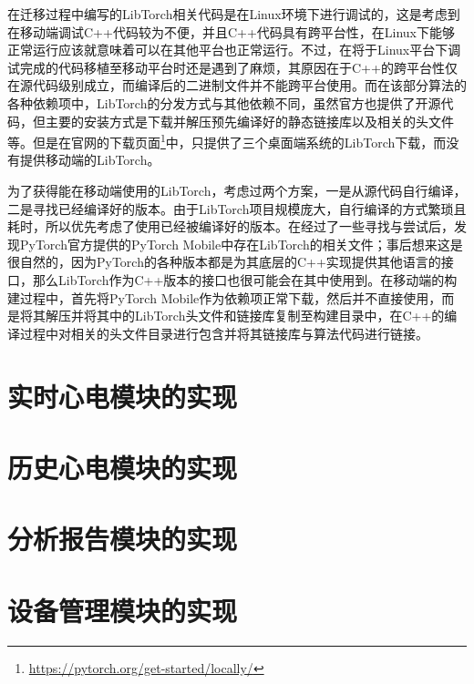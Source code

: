在迁移过程中编写的LibTorch相关代码是在Linux环境下进行调试的，这是考虑到在移动端调试C++代码较为不便，并且C++代码具有跨平台性，在Linux下能够正常运行应该就意味着可以在其他平台也正常运行。不过，在将于Linux平台下调试完成的代码移植至移动平台时还是遇到了麻烦，其原因在于C++的跨平台性仅在源代码级别成立，而编译后的二进制文件并不能跨平台使用。而在该部分算法的各种依赖项中，LibTorch的分发方式与其他依赖不同，虽然官方也提供了开源代码，但主要的安装方式是下载并解压预先编译好的静态链接库以及相关的头文件等。但是在官网的下载页面\footnote{\url{https://pytorch.org/get-started/locally/}}中，只提供了三个桌面端系统的LibTorch下载，而没有提供移动端的LibTorch。

为了获得能在移动端使用的LibTorch，考虑过两个方案，一是从源代码自行编译，二是寻找已经编译好的版本。由于LibTorch项目规模庞大，自行编译的方式繁琐且耗时，所以优先考虑了使用已经被编译好的版本。在经过了一些寻找与尝试后，发现PyTorch官方提供的PyTorch Mobile中存在LibTorch的相关文件；事后想来这是很自然的，因为PyTorch的各种版本都是为其底层的C++实现提供其他语言的接口，那么LibTorch作为C++版本的接口也很可能会在其中使用到。在移动端的构建过程中，首先将PyTorch Mobile作为依赖项正常下载，然后并不直接使用，而是将其解压并将其中的LibTorch头文件和链接库复制至构建目录中，在C++的编译过程中对相关的头文件目录进行包含并将其链接库与算法代码进行链接。


\section{实时心电模块的实现}\label{sec:real-time}



\section{历史心电模块的实现}\label{sec:history}



\section{分析报告模块的实现}\label{sec:analytics}



\section{设备管理模块的实现}\label{sec:device}



